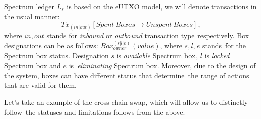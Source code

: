 Spectrum ledger $L_s$ is based on the eUTXO model, we will denote transactions in the usual manner:
\begin{equation}
{Tx_{(in | out)}[Spent\ Boxes \rightarrow Unspent \ Boxes]}
    ,
\end{equation}
where ${in, out}$ stands for \textit{inbound} or \textit{outbound} transaction type respectively.
Box designations can be as follows: ${Box_{owner}^{(s | l | e)}(value)}$, where ${s, l, e}$ stands\
for the Spectrum box status.
Designation $s$ is \textit{available} Spectrum box, $l$ is \textit{locked} Spectrum box and $e$ is\
\textit{eliminating} Spectrum box.
Moreover, due to the design of the system, boxes can have different status that determine\
the range of actions that are valid for them.

Let's take an example of the cross-chain swap, which will allow us to distinctly follow\
the statuses and limitations follows from the above.

